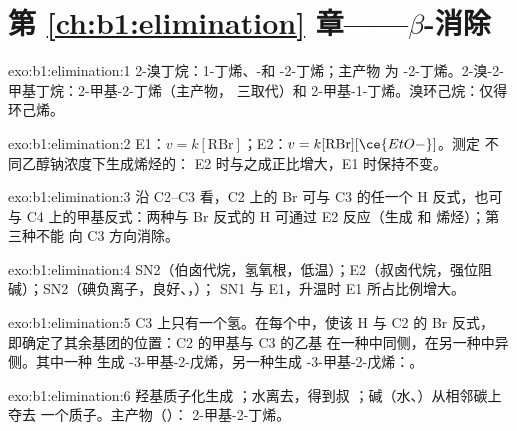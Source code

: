 \section*{第 \ref{ch:b1:elimination} 章——\texorpdfstring{$\beta$}{贝塔}-消除}

\begin{solution}{exo:b1:elimination:1}
2-溴丁烷：1-丁烯、-和 -2-丁烯；主产物
为 -2-丁烯。2-溴-2-甲基丁烷：2-甲基-2-丁烯（主产物，
三取代）和 2-甲基-1-丁烯。溴环己烷：仅得环己烯。
\end{solution}

\begin{solution}{exo:b1:elimination:2}
E1：$v = k[\mathrm{RBr}]$；E2：$v = k[\mathrm{RBr}][\ce{EtO-}]$。测定
不同乙醇钠浓度下生成烯烃的：
E2 时与之成正比增大，E1 时保持不变。
\end{solution}

\begin{solution}{exo:b1:elimination:3}
沿 C2--C3 看，C2 上的 Br 可与 C3 的任一个 H 反式，也可与
C4 上的甲基反式：两种与 Br 反式的 H 可通过 E2
反应（生成  和  烯烃）；第三种不能
向 C3 方向消除。
\end{solution}

\begin{solution}{exo:b1:elimination:4}
SN2（伯卤代烷，氢氧根，低温）；E2（叔卤代烷，强位阻
碱）；SN2（碘负离子，良好、，）；
SN1 与 E1，升温时 E1 所占比例增大。
\end{solution}

\begin{solution}{exo:b1:elimination:5}
C3 上只有一个氢。在每个中，使该 H 与 C2 的 Br 反式，
即确定了其余基团的位置：C2 的甲基与 C3 的乙基
在一种中同侧，在另一种中异侧。其中一种
生成 -3-甲基-2-戊烯，另一种生成
-3-甲基-2-戊烯：。
\end{solution}

\begin{solution}{exo:b1:elimination:6}
羟基质子化生成 ；水离去，得到叔
；碱（水、）从相邻碳上夺去
一个质子。主产物（）：
2-甲基-2-丁烯。
\end{solution}

